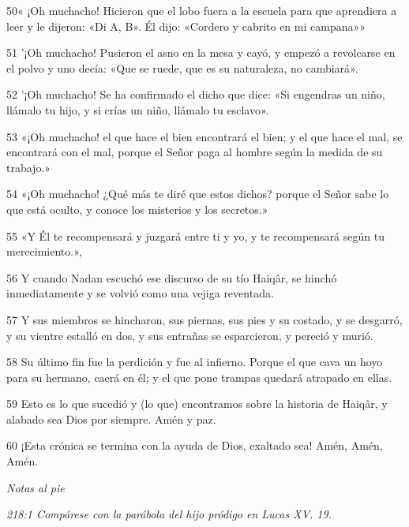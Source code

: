 \par 50« ¡Oh muchacho! Hicieron que el lobo fuera a la escuela para que aprendiera a leer y le dijeron: «Di A, B». Él dijo: «Cordero y cabrito en mi campana»»

\par 51 '¡Oh muchacho! Pusieron el asno en la mesa y cayó, y empezó a revolcarse en el polvo y uno decía: «Que se ruede, que es su naturaleza, no cambiará».

\par 52 '¡Oh muchacho! Se ha confirmado el dicho que dice: «Si engendras un niño, llámalo tu hijo, y si crías un niño, llámalo tu esclavo».

\par 53 «¡Oh muchacho! el que hace el bien encontrará el bien; y el que hace el mal, se encontrará con el mal, porque el Señor paga al hombre según la medida de su trabajo.»

\par 54 «¡Oh muchacho! ¿Qué más te diré que estos dichos? porque el Señor sabe lo que está oculto, y conoce los misterios y los secretos.»

\par 55 «Y Él te recompensará y juzgará entre ti y yo, y te recompensará según tu merecimiento.»,

\par 56 Y cuando Nadan escuchó ese discurso de su tío Haiqâr, se hinchó inmediatamente y se volvió como una vejiga reventada.

\par 57 Y sus miembros se hincharon, sus piernas, sus pies y su costado, y se desgarró, y su vientre estalló en dos, y sus entrañas se esparcieron, y pereció y murió.

\par 58 Su último fin fue la perdición y fue al infierno. Porque el que cava un hoyo para su hermano, caerá en él; y el que pone trampas quedará atrapado en ellas.

\par 59 Esto es lo que sucedió y (lo que) encontramos sobre la historia de Haiqâr, y alabado sea Dios por siempre. Amén y paz.

\par 60 ¡Esta crónica se termina con la ayuda de Dios, exaltado sea! Amén, Amén, Amén.

\par \textit{Notas al pie}

\par \textit{218:1 Compárese con la parábola del hijo pródigo en Lucas XV. 19.}


